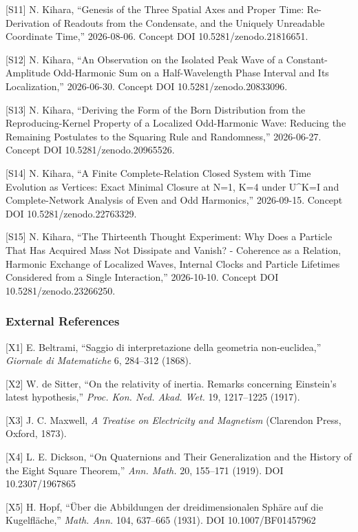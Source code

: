 \documentclass[
  a4paper,
]{article}
\begin{document}
{[}S11{]} N. Kihara, ``Genesis of the Three Spatial Axes and Proper
Time: Re-Derivation of Readouts from the Condensate, and the Uniquely
Unreadable Coordinate Time,'' 2026-08-06. Concept DOI
10.5281/zenodo.21816651.

{[}S12{]} N. Kihara, ``An Observation on the Isolated Peak Wave of a
Constant-Amplitude Odd-Harmonic Sum on a Half-Wavelength Phase Interval
and Its Localization,'' 2026-06-30. Concept DOI 10.5281/zenodo.20833096.

{[}S13{]} N. Kihara, ``Deriving the Form of the Born Distribution from
the Reproducing-Kernel Property of a Localized Odd-Harmonic Wave:
Reducing the Remaining Postulates to the Squaring Rule and Randomness,''
2026-06-27. Concept DOI 10.5281/zenodo.20965526.

{[}S14{]} N. Kihara, ``A Finite Complete-Relation Closed System with
Time Evolution as Vertices: Exact Minimal Closure at N=1, K=4 under
U\^{}K=I and Complete-Network Analysis of Even and Odd Harmonics,''
2026-09-15. Concept DOI 10.5281/zenodo.22763329.

{[}S15{]} N. Kihara, ``The Thirteenth Thought Experiment: Why Does a
Particle That Has Acquired Mass Not Dissipate and Vanish? - Coherence as
a Relation, Harmonic Exchange of Localized Waves, Internal Clocks and
Particle Lifetimes Considered from a Single Interaction,'' 2026-10-10.
Concept DOI 10.5281/zenodo.23266250.

\subsubsection{External References}\label{external-references}

{[}X1{]} E. Beltrami, ``Saggio di interpretazione della geometria
non-euclidea,'' \emph{Giornale di Matematiche} 6, 284--312 (1868).

{[}X2{]} W. de Sitter, ``On the relativity of inertia. Remarks
concerning Einstein's latest hypothesis,'' \emph{Proc. Kon. Ned. Akad.
Wet.} 19, 1217--1225 (1917).

{[}X3{]} J. C. Maxwell, \emph{A Treatise on Electricity and Magnetism}
(Clarendon Press, Oxford, 1873).

{[}X4{]} L. E. Dickson, ``On Quaternions and Their Generalization and
the History of the Eight Square Theorem,'' \emph{Ann. Math.} 20,
155--171 (1919). DOI 10.2307/1967865

{[}X5{]} H. Hopf, ``Über die Abbildungen der dreidimensionalen Sphäre
auf die Kugelfläche,'' \emph{Math. Ann.} 104, 637--665 (1931). DOI
10.1007/BF01457962
\end{document}
